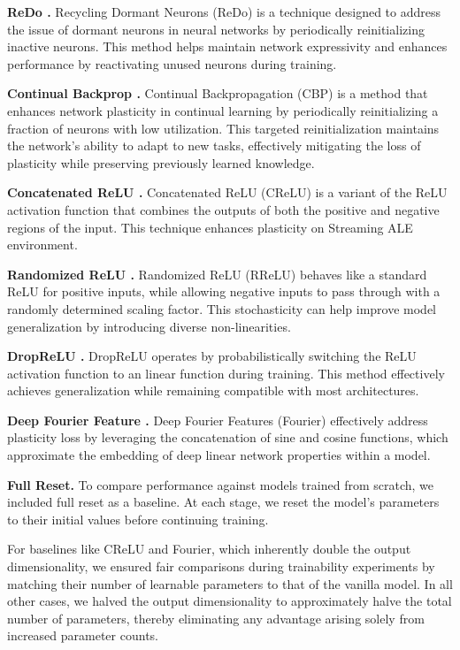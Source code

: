 \textbf{ReDo \cite{sokar2023dormant}.} Recycling Dormant Neurons (ReDo) is a technique designed to address the issue of dormant neurons in neural networks by periodically reinitializing inactive neurons. This method helps maintain network expressivity and enhances performance by reactivating unused neurons during training.

\textbf{Continual Backprop \cite{dohare2024loss}.} Continual Backpropagation (CBP) is a method that enhances network plasticity in continual learning by periodically reinitializing a fraction of neurons with low utilization. This targeted reinitialization maintains the network’s ability to adapt to new tasks, effectively mitigating the loss of plasticity while preserving previously learned knowledge.

\textbf{Concatenated ReLU \cite{abbas2023loss}. } Concatenated ReLU (CReLU) is a variant of the ReLU activation function that combines the outputs of both the positive and negative regions of the input. This technique enhances plasticity on Streaming ALE environment. 

\textbf{Randomized ReLU \cite{xu2015empirical}.} Randomized ReLU (RReLU) behaves like a standard ReLU for positive inputs, while allowing negative inputs to pass through with a randomly determined scaling factor. This stochasticity can help improve model generalization by introducing diverse non-linearities.

\textbf{DropReLU \cite{liang2021drop}.} DropReLU operates by probabilistically switching the ReLU activation function to an linear function during training. This method effectively achieves generalization while remaining compatible with most architectures.

\textbf{Deep Fourier Feature \cite{lewandowski2024plastic}.} Deep Fourier Features (Fourier) effectively address plasticity loss by leveraging the concatenation of sine and cosine functions, which approximate the embedding of deep linear network properties within a model.

\textbf{Full Reset. } To compare performance against models trained from scratch, we included full reset as a baseline. At each stage, we reset the model’s parameters to their initial values before continuing training.


For baselines like CReLU and Fourier, which inherently double the output dimensionality, we ensured fair comparisons during trainability experiments by matching their number of learnable parameters to that of the vanilla model. In all other cases, we halved the output dimensionality to approximately halve the total number of parameters, thereby eliminating any advantage arising solely from increased parameter counts.

